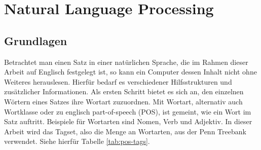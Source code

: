 %
\chapter{Natural Language Processing}
\label{sec:nlp}

\section{Grundlagen}
\label{sec:nlp:grundlagen}

Betrachtet man einen Satz in einer natürlichen Sprache, die im Rahmen dieser Arbeit auf Englisch festgelegt ist, so kann ein Computer dessen Inhalt nicht ohne Weiteres herauslesen. Hierfür bedarf es verschiedener Hilfsstrukturen und zusätzlicher Informationen. Als ersten Schritt bietet es sich an, den einzelnen Wörtern eines Satzes ihre Wortart zuzuordnen. Mit Wortart, alternativ auch Wortklasse oder zu englisch part-of-speech (POS), ist gemeint, wie ein Wort im Satz auftritt. Beispiele für Wortarten sind Nomen, Verb und Adjektiv. In dieser Arbeit wird das Tagset, also die Menge an Wortarten, aus der Penn Treebank verwendet. Siehe hierfür Tabelle \ref{tab:pos-tags}.
